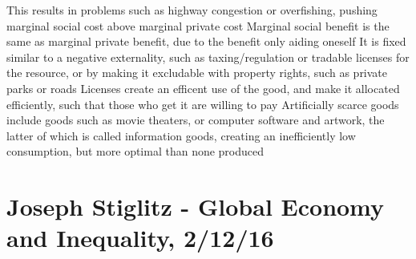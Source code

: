 \documentclass[11 pt, twoside]{article}
\newenvironment{outline*}
{
	\begin{outline}[enumerate]
	}
	{\end{outline}
}
\begin{document}
\begin{outline*}
\2 This results in problems such as highway congestion or overfishing, pushing marginal social cost above marginal private cost
\2 Marginal social benefit is the same as marginal private benefit, due to the benefit only aiding oneself
\2 It is fixed similar to a negative externality, such as taxing/regulation or tradable licenses for the resource, or by making it excludable with property rights, such as private parks or roads
\3 Licenses create an efficent use of the good, and make it allocated efficiently, such that those who get it are willing to pay
\1 Artificially scarce goods include goods such as movie theaters, or computer software and artwork, the latter of which is called information goods, creating an inefficiently low consumption, but more optimal than none produced
\end{outline*}
\section{Joseph Stiglitz - Global Economy and Inequality, 2/12/16}
\end{document}

